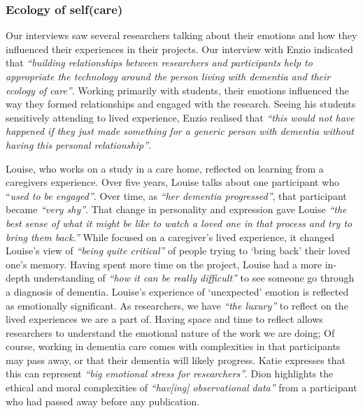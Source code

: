 \subsubsection{Ecology of self(care)}
\label{Ethics:ThemePartTwo:Care}
Our interviews saw several researchers talking about their emotions and how they influenced their experiences in their projects. Our interview with Enzio indicated that \textit{“building relationships between researchers and participants help to appropriate the technology around the person living with dementia and their ecology of care”}. Working primarily with students, their emotions influenced the way they formed relationships and engaged with the research. Seeing his students sensitively attending to lived experience, Enzio realised that \textit{“this would not have happened if they just made something for a generic person with dementia without having this personal relationship”}. 

Louise, who works on a study in a care home, reflected on learning from a caregivers experience. Over five years, Louise talks about one participant who “\textit{used to be engaged”}. Over time, as \textit{“her dementia progressed”}, that participant became \textit{“very shy”}. That change in personality and expression gave Louise \textit{“the best sense of what it might be like to watch a loved one in that process and try to bring them back.”} While focused on a caregiver’s lived experience, it changed Louise’s view of\textit{ “being quite critical”} of people trying to ‘bring back’ their loved one’s memory. Having spent more time on the project, Louise had a more in-depth understanding of \textit{“how it can be really difficult”} to see someone go through a diagnosis of dementia. Louise’s experience of ‘unexpected’ emotion is reflected as emotionally significant. As researchers, we have \textit{“the luxury”} to reflect on the lived experiences we are a part of. Having space and time to reflect allows researchers to understand the emotional nature of the work we are doing; Of course, working in dementia care comes with complexities in that participants may pass away, or that their dementia will likely progress. Katie expresses that this can represent \textit{“big emotional stress for researchers”}. Dion highlights the ethical and moral complexities of \textit{“hav[ing] observational data”} from a participant who had passed away before any publication. 

